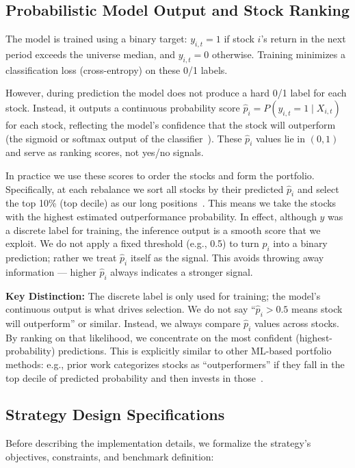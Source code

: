\documentclass[conference]{IEEEtran}
\begin{document}
\subsection{Probabilistic Model Output and Stock Ranking}
The model is trained using a binary target: $y_{i,t}=1$ if stock $i$'s return in the next period exceeds the universe median, and $y_{i,t}=0$ otherwise. Training minimizes a classification loss (cross-entropy) on these 0/1 labels.

However, during prediction the model does not produce a hard 0/1 label for each stock. Instead, it outputs a continuous probability score $\hat{p}_i = P(y_{i,t}=1 \mid X_{i,t})$ for each stock, reflecting the model's confidence that the stock will outperform (the sigmoid or softmax output of the classifier~\cite{alphaarchitect}). These $\hat{p}_i$ values lie in $(0,1)$ and serve as ranking scores, not yes/no signals.

In practice we use these scores to order the stocks and form the portfolio. Specifically, at each rebalance we sort all stocks by their predicted $\hat{p}_i$ and select the top 10\% (top decile) as our long positions~\cite{chen2018}. This means we take the stocks with the highest estimated outperformance probability. In effect, although $y$ was a discrete label for training, the inference output is a smooth score that we exploit. We do not apply a fixed threshold (e.g., 0.5) to turn $\hat{p}_i$ into a binary prediction; rather we treat $\hat{p}_i$ itself as the signal. This avoids throwing away information --- higher $\hat{p}_i$ always indicates a stronger signal.

\textbf{Key Distinction:} The discrete label is only used for training; the model's continuous output is what drives selection. We do not say ``$\hat{p}_i > 0.5$ means stock will outperform'' or similar. Instead, we always compare $\hat{p}_i$ values across stocks. By ranking on that likelihood, we concentrate on the most confident (highest-probability) predictions. This is explicitly similar to other ML-based portfolio methods: e.g., prior work categorizes stocks as ``outperformers'' if they fall in the top decile of predicted probability and then invests in those~\cite{chen2018}.

\subsection{Strategy Design Specifications}
Before describing the implementation details, we formalize the strategy's objectives, constraints, and benchmark definition:
\end{document}

